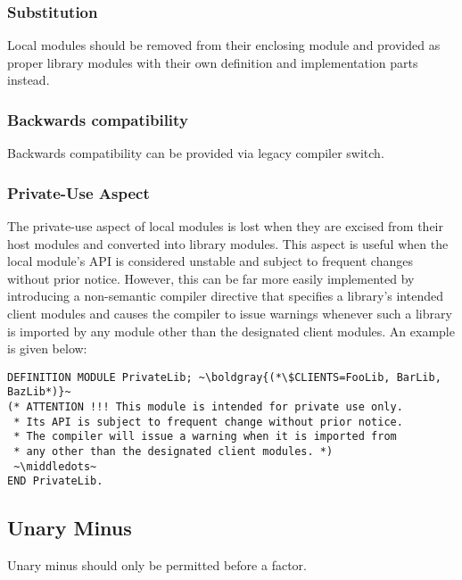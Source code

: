\documentclass[10pt,a4paper]{article}
\newcommand\boldgray[1]{\textcolor{gray}{\textbf{#1}}}
\newcommand\middledots{\textperiodcentered\textperiodcentered\textperiodcentered}
\begin{document}
\subsubsection{Substitution}
Local modules should be removed from their enclosing module and provided as
proper library modules with their own definition and implementation parts
instead.

\subsubsection{Backwards compatibility}

Backwards compatibility can be provided via legacy compiler switch.

\subsubsection{Private-Use Aspect}

The private-use aspect of local modules is lost when they are excised from
their host modules and converted into library modules. This aspect is useful
when the local module's API is considered unstable and subject to frequent
changes without prior notice. However, this can be far more easily implemented
 by introducing a \gls{non-semantic compiler directive} that specifies a
 library's intended client modules and causes the compiler to issue warnings
 whenever such a library is imported by any module other than the designated
 client modules. An example is given below:

\lstset{style=modula2}
\begin{lstlisting}[escapechar=~]
DEFINITION MODULE PrivateLib; ~\boldgray{(*\$CLIENTS=FooLib, BarLib, BazLib*)}~
(* ATTENTION !!! This module is intended for private use only.
 * Its API is subject to frequent change without prior notice.
 * The compiler will issue a warning when it is imported from
 * any other than the designated client modules. *)
 ~\middledots~
END PrivateLib.
\end{lstlisting}


\subsection{Unary Minus}

Unary minus should only be permitted before a factor.
\end{document}
